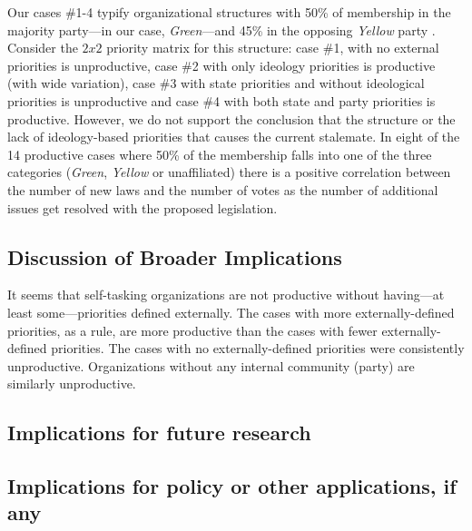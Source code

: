 \documentclass[pdftex,12pt]{llncs}
\begin{document}
Our cases \#1-4 typify organizational structures with 50\% of membership in the majority party---in our case, \textit{Green}---and 45\% in the opposing \textit{Yellow} party .
Consider the $2 x 2$ priority matrix for this structure: case \#1, with no external priorities is unproductive, case \#2 with only ideology priorities is productive (with wide variation), case \#3 with state priorities and without ideological priorities is unproductive and case \#4 with both state and party priorities is productive. 
However, we do not support the conclusion that the structure or the lack of ideology-based priorities that causes the current stalemate.
In eight of the 14 productive cases where 50\% of the membership falls into one of the three categories (\textit{Green}, \textit{Yellow} or unaffiliated) there is a positive correlation between the number of new laws and the number of votes as the number of additional issues get resolved with the proposed legislation.   
 
\subsection{Discussion of Broader Implications}
It seems that self-tasking organizations are not productive without having---at least some---priorities defined externally. 
The cases with more externally-defined priorities, as a rule, are more productive than the cases with fewer externally-defined priorities. 
The cases with no externally-defined priorities were consistently unproductive.  
Organizations without any internal community (party) are similarly unproductive.

\subsection{Implications for future research}


\subsection{Implications for policy or other applications, if any}
\end{document}
